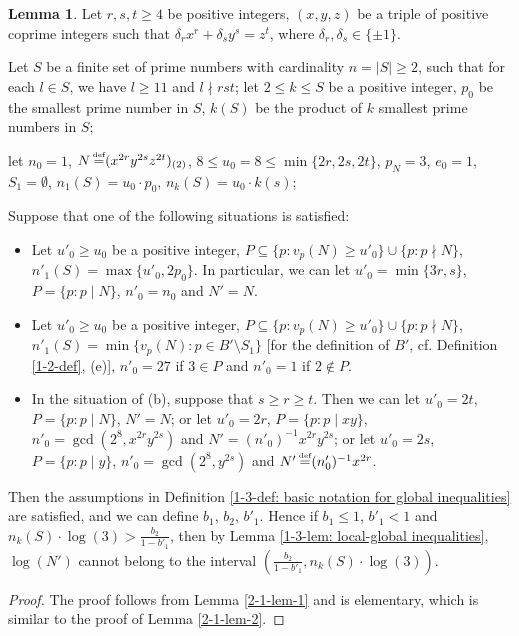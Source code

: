 \documentclass[a4paper, 12pt]{article}
\DeclareMathOperator{\defeq}{\overset{\text{\tiny{def}}}{=}}
\numberwithin{equation}{section}
\theoremstyle{definition}
\newtheorem{lem}[thm]{Lemma}
\begin{document}
\begin{lem} \label{2-1-lem-3}
Let $r,s,t \ge 4$ be positive integers, $(x,y,z)$ be a triple of positive coprime integers such that $\delta_r x^r + \delta_s y^s =  z^t$, where $\delta_r,\delta_s \in \{\pm 1\}$.

Let $S$ be a finite set of prime numbers with cardinality $n = |S| \ge 2$, such that for each $l\in S$, we have $l \ge 11$ and $l\nmid rst$;
let $2\le k\le S$ be a positive integer, $p_0$ be the smallest prime number in $S$, $k(S)$ be the product of $k$ smallest prime numbers in $S$;

let $n_0 = 1$, $N \defeq (x^{2r} y^{2s} z^{2t})_{(2)}$, $8 \le u_0 = 8 \le \min\{2r, 2s, 2t\} $, $p_N = 3$, $e_0 = 1$, $S_1 = \emptyset$, $n_1(S) = u_0 \cdot p_0$, $n_k(S) = u_0 \cdot k(s)$;

Suppose that one of the following situations is satisfied:

\begin{itemize}
\item [(a)] Let $u'_0 \ge u_0$ be a positive integer, $P\subseteq \{p: v_p(N) \ge u'_0 \} \cup \{p: p\nmid N\}$, $n'_1(S) = \max\{u'_0, 2p_0\}$.
In particular, we can let $u'_0 = \min\{3r, s\}$, $P = \{p: p\mid N\}$, $n'_0 = n_0$ and $N' = N$.

\item [(b)] Let $u'_0 \ge u_0$ be a positive integer, $P\subseteq \{p: v_p(N) \ge u'_0 \} \cup \{p: p\nmid N\}$, $n'_1(S) = \min\{v_p(N): p\in B'\setminus S_1\}$ [for the definition of $B'$, cf. Definition \ref{1-2-def}, (e)], $n'_0 = 27$ if $3\in P$ and $n'_0 = 1$ if $2\notin P$.

\item [(c)] In the situation of (b), suppose that $s\ge r\ge t$. 
Then we can let $u'_0 = 2t$, $P = \{p: p\mid N\}$, $N' = N$; 
or let $u'_0 = 2r$, $P = \{p: p\mid xy\}$, $n'_0 = \gcd(2^8, x^{2r} y^{2s})$ and $N' = (n'_0)^{-1} x^{2r} y^{2s}$; 
or let $u'_0 = 2s$, $P = \{p: p\mid y\}$, $n'_0 = \gcd(2^8, y^{2s})$ and $N' \defeq (n'_0)^{-1} x^{2r}$.
\end{itemize}

Then the assumptions in Definition \ref{1-3-def: basic notation for global inequalities} are satisfied, and we can define $b_1$, $b_2$, $b'_1$. 
Hence if $b_1 \le  1$, $b'_1 < 1$ and $n_k(S)\cdot \log(3) > \frac{b_2}{1-b'_1}$, then by Lemma \ref{1-3-lem: local-global inequalities}, $\log(N')$ cannot belong to the interval $(\frac{b_2}{1-b'_1}, n_k(S)\cdot \log(3) ) .$


\end{lem}
\begin{proof}
The proof follows from Lemma \ref{2-1-lem-1} and is elementary, which is similar to the proof of Lemma \ref{2-1-lem-2}.
\end{proof}
\end{document}

